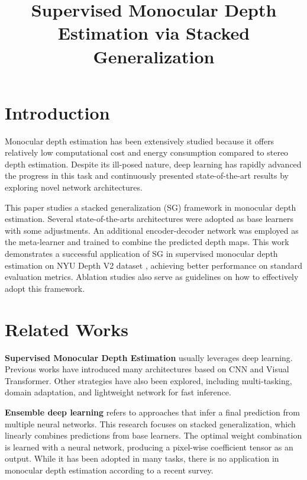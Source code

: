 \documentclass[conference]{IEEEtran}
\begin{document}
\title{\LARGE Supervised Monocular Depth Estimation via Stacked Generalization}

\author{
}

\maketitle

\section{Introduction}
Monocular depth estimation has been extensively studied because it offers relatively low computational cost and energy consumption compared to stereo depth estimation. Despite its ill-posed nature, deep learning has rapidly advanced the progress in this task and continuously presented state-of-the-art results by exploring novel network architectures.

This paper studies a stacked generalization (SG) framework in monocular depth estimation. Several state-of-the-arts architectures \cite{adabins, bts, lapdepth} were adopted as base learners with some adjustments. An additional encoder-decoder network was employed as the meta-learner and trained to combine the predicted depth maps. This work demonstrates a successful application of SG in supervised monocular depth estimation on NYU Depth V2 dataset \cite{nyu}, achieving better performance on standard evaluation metrics. Ablation studies also serve as guidelines on how to effectively adopt this framework.

\section{Related Works}
\textbf{Supervised Monocular Depth Estimation} usually leverages deep learning. Previous works have introduced many architectures based on CNN and Visual Transformer. Other strategies have also been explored, including multi-tasking, domain adaptation, and lightweight network for fast inference.

\textbf{Ensemble deep learning} refers to approaches that infer a final prediction from multiple neural networks. This research focuses on stacked generalization, which linearly combines predictions from base learners. The optimal weight combination is learned with a neural network, producing a pixel-wise coefficient tensor as an output. While it has been adopted in many tasks, there is no application in monocular depth estimation according to a recent survey. 
\end{document}
